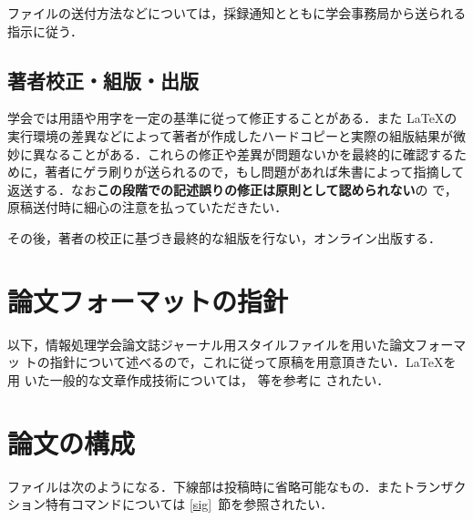 \documentclass[submit,techrep]{ipsj}
\begin{document}
ファイルの送付方法などについては，採録通知とともに学会事務局から送られる
指示に従う．

\subsection{著者校正・組版・出版}

学会では用語や用字を一定の基準に従って修正することがある．また \LaTeX の
実行環境の差異などによって著者が作成したハードコピーと実際の組版結果が微
妙に異なることがある．これらの修正や差異が問題ないかを最終的に確認するた
めに，著者にゲラ刷りが送られるので，もし問題があれば朱書によって指摘して
返送する．なお{\bf この段階での記述誤りの修正は原則として認められない}の
で，原稿送付時に細心の注意を払っていただきたい．

その後，著者の校正に基づき最終的な組版を行ない，オンライン出版する．



\section{論文フォーマットの指針}
\label{sec:format}

以下，情報処理学会論文誌ジャーナル用スタイルファイルを用いた論文フォーマッ
トの指針について述べるので，これに従って原稿を用意頂きたい．\LaTeX を用
いた一般的な文章作成技術については，\cite{okumura, companion} 等を参考に
されたい．

\section{論文の構成}
\label{config}

ファイルは次のようになる．下線部は投稿時に省略可能なもの．またトランザク
ション特有コマンドについては \ref{sig}~節を参照されたい．
\end{document}
